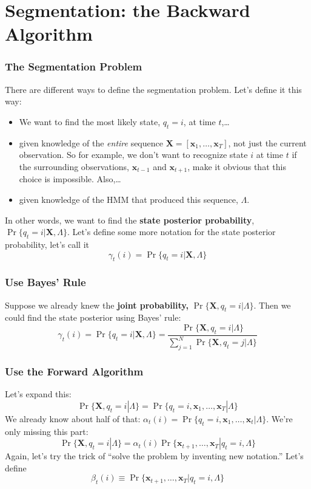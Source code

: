 \documentclass{beamer}
\begin{document}
\section[Segmentation]{Segmentation: the Backward Algorithm}
\setcounter{subsection}{1}

\begin{frame}
  \frametitle{The Segmentation Problem}

  There are different ways to define the segmentation problem.  Let's
  define it this way:
  \begin{itemize}
  \item We want to find the most likely state, $q_t=i$, at time $t$,\ldots
  \item given knowledge of the {\em entire} sequence
    $\mathbf{X}=[\mathbf{x}_1,\ldots,\mathbf{x}_T]$, not just the current observation.
    So for example, we don't want to recognize state $i$ at time $t$ if
    the surrounding observations, $\mathbf{x}_{t-1}$ and $\mathbf{x}_{t+1}$, make it obvious that
    this choice is impossible.  Also,\ldots
  \item given knowledge of the HMM that produced this sequence, $\Lambda$.
  \end{itemize}

  In other words, we want to find the {\bf state posterior
    probability}, $\Pr\{q_t=i|\mathbf{X},\Lambda\}$.  Let's define some more
  notation for the state posterior probability, let's call it
  \[
  \gamma_t(i) = \Pr\{q_t=i|\mathbf{X},\Lambda\}
  \]
\end{frame}

\begin{frame}
  \frametitle{Use Bayes' Rule}

  Suppose we already knew the {\bf joint probability,}
  $\Pr\{\mathbf{X},q_t=i|\Lambda\}$.  Then we could find the state posterior using
  Bayes' rule:
  \begin{displaymath}
    \gamma_t(i) = \Pr\{q_t=i|\mathbf{X},\Lambda\} = \frac{\Pr\{\mathbf{X},q_t=i|\Lambda\}}{\sum_{j=1}^N \Pr\{\mathbf{X},q_t=j|\Lambda\}}
  \end{displaymath}
\end{frame}

\begin{frame}
  \frametitle{Use the Forward Algorithm}

  Let's expand this:
  \[
  \Pr\{\mathbf{X},q_t=i|\Lambda\} = \Pr\{q_t=i,\mathbf{x}_1,\ldots,\mathbf{x}_T|\Lambda\}
  \]
  We already know about half of that: $\alpha_t(i)=\Pr\{q_t=i,\mathbf{x}_1,\ldots,\mathbf{x}_t|\Lambda\}$.
  We're only missing this part:
  \[
  \Pr\{\mathbf{X},q_t=i|\Lambda\} = \alpha_t(i)\Pr\{\mathbf{x}_{t+1},\ldots,\mathbf{x}_T|q_t=i,\Lambda\}
  \]
  Again, let's try the trick of ``solve the problem by inventing new notation.''  Let's define
  \[
  \beta_t(i) \equiv \Pr\{\mathbf{x}_{t+1},\ldots,\mathbf{x}_T|q_t=i,\Lambda\}
  \]
\end{frame}
\end{document}

